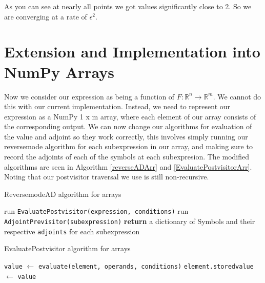 \documentclass{article}
\begin{document}
As you can see at nearly all points we got values significantly close to 2. So we are converging at a rate of $\epsilon^2$.





\section{Extension and Implementation into NumPy Arrays}

Now we consider our expression as being a function of $F: \mathbb{R}^n \longrightarrow \mathbb{R}^m$. We cannot do this with our current implementation. Instead, we need to represent our expression as a NumPy 1 x m array, where each element of our array consists of the corresponding output. We can now change our algorithms for evaluation of the value and adjoint so they work correctly, this involves simply running our reversemode algorithm for each subexpression in our array, and making sure to record the adjoints of each of the symbols at each subexpresion. The modified algorithms are seen in Algorithm \ref{reverseADArr} and \ref{EvaluatePostvisitorArr}. Noting that our postvisitor traversal we use is still non-recursive.

\begin{algorithm}[h]
\caption{ReversemodeAD algorithm for arrays}\label{reverseADArr}
\begin{algorithmic}[1]
\State run \verb|EvaluatePostvisitor(expression, conditions)|
\State run \verb|AdjointPrevisitor(subexpression)|
\EndFor
\State \textbf{return} a dictionary of Symbols and their respective \verb|adjoints| for each subexpression
\EndProcedure
\end{algorithmic}
\end{algorithm}

\begin{algorithm}[h!]
\caption{EvaluatePostvisitor algorithm for arrays}\label{EvaluatePostvisitorArr}
\begin{algorithmic}[1]
\State \verb|value| $\gets$ \verb|evaluate(element, operands, conditions)|
\State \verb|element.storedvalue| $\gets$ \verb|value|
\EndFor
\EndFor
\EndProcedure
\end{algorithmic}
\end{algorithm}
\end{document}

